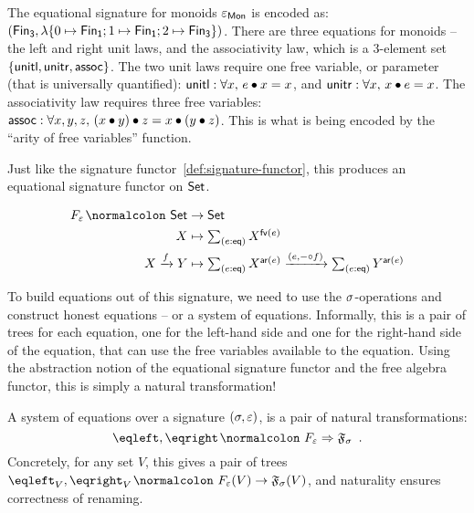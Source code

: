 \begin{example}
    The equational signature for monoids $\varepsilon_{\mathsf{Mon}}$ is encoded as:
    $(\Fin[3],\lambda \{0 \mapsto \Fin[1] ; 1 \mapsto \Fin[1] ; 2 \mapsto \Fin[3] \})$.
    There are three equations for monoids -- the left and right unit laws, and the associativity law,
    which is a 3-element set $\{ \operatorname{\mathsf{unitl}}, \operatorname{\mathsf{unitr}}, \operatorname{\mathsf{assoc}} \}$.
    The two unit laws require one free variable, or parameter (that is universally quantified):
    $\term{unitl} : \forall x,\, e \mult x \id x$, and $\term{unitr} : \forall x,\, x \mult e \id x$.
    The associativity law requires three free variables:
    $\term{assoc} : \forall x, y, z,\, (x \mult y) \mult z \id x \mult (y \mult z)$.
    This is what is being encoded by the ``arity of free variables'' function.
\end{example}

Just like the signature functor~\cref{def:signature-functor}, this produces an equational signature functor on $\mathsf{Set}$.
\begin{definition}
    \label{def:equational-signature-functor}
    \begin{align*}
        \EqSig \colon \Set & \to \Set                             \\
        X                  & \mapsto \dsum{e:\eqop}{X^{\eqfv(e)}} \\
        X \xto{f} Y        & \mapsto
        \dsum{e:\eqop}{X^{\ar(e)}}
        \xto{(e, \blank \comp f)}
        \dsum{e:\eqop}{Y^{\ar(e)}}
    \end{align*}
\end{definition}

To build equations out of this signature,
we need to use the $\sigma$-operations and construct honest equations -- or a system of equations.
%
Informally, this is a pair of trees for each equation,
one for the left-hand side and one for the right-hand side of the equation,
that can use the free variables available to the equation.
%
Using the abstraction notion of the equational signature functor and the free algebra functor,
this is simply a natural transformation!

\begin{definition}
    A system of equations over a signature $(\sigma,\varepsilon)$, is a pair of natural transformations:
    \[
        \eqleft, \eqright \colon \EqSig \natto \str{F}_{\sig} \enspace.
    \]
    Concretely, for any set $V$,
    this gives a pair of trees $\eqleft_{V}, \eqright_{V}\colon \EqSig(V) \to \str{F}_{\sig}(V)$,
    and naturality ensures correctness of renaming.
\end{definition}

